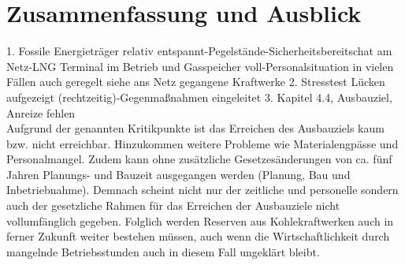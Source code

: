 \section{Zusammenfassung und Ausblick}

	1. Fossile Energieträger relativ entspannt-Pegelstände-Sicherheitsbereitschat am Netz-LNG Terminal im Betrieb und Gasspeicher voll-Personalsituation in vielen Fällen auch geregelt siehe ans Netz gegangene Kraftwerke
	2. Stresstest Lücken aufgezeigt (rechtzeitig)-Gegenmaßnahmen eingeleitet
	3. Kapitel 4.4, Ausbauziel, Anreize fehlen \\
	
	
	Aufgrund der genannten Kritikpunkte ist das Erreichen des Ausbauziels kaum bzw. nicht erreichbar. Hinzukommen weitere Probleme wie Materialengpässe und Personalmangel.
	Zudem kann ohne zusätzliche Gesetzesänderungen von ca. fünf Jahren Planungs- und Bauzeit ausgegangen werden (Planung, Bau und Inbetriebnahme).
	Demnach scheint nicht nur der zeitliche und personelle sondern auch der gesetzliche Rahmen für das Erreichen der Ausbauziele nicht vollumfänglich gegeben.
	Folglich werden Reserven aus Kohlekraftwerken auch in ferner Zukunft weiter bestehen müssen, auch wenn die Wirtschaftlichkeit durch mangelnde Betriebsstunden auch in diesem Fall ungeklärt bleibt.
	
	
	
	